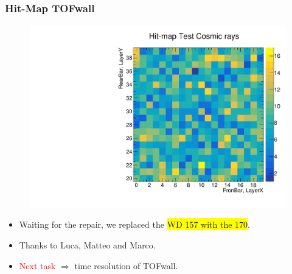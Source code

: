 \begin{frame} [fragile]
    \small
        \frametitle{Hit-Map TOFwall}
                \begin{figure}
                 \centering
                    \includegraphics[scale=0.28]{figures/hit_map_10nov.pdf}
                \end{figure}
            
            
				\begin{itemize}
                    \item Waiting for the repair, we replaced the \colorbox{yellow}{WD 157 with the 170}.
                    \item Thanks to Luca, Matteo and Marco.
                    \item \textcolor{red}{Next task} $\Longrightarrow$ time resolution of TOFwall.
                \end{itemize}    
    \end{frame}
